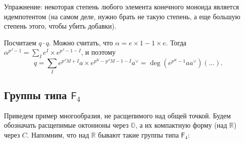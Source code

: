 \documentclass[a4paper]{article}
\theoremstyle{definition}
\begin{document}
\begin{enumerate}
Упражнение: некоторая степень любого элемента конечного моноида
является идемпотентом
(на самом деле, нужно брать не такую степень, а еще большую
степень этого, чтобы убить добавки).

Посчитаем $q\cdot q$.
Можно считать, что $\alpha = e\times 1 - 1\times e$.
Тогда
$\alpha^{p^J-1} = \sum_{I} e^I \times e^{p^J-1-I}$,
и поэтому
\[
q = \sum_I e^{p^J M + I} a
\times e^{p^K-p^J M - 1 - I}a^{\vee}
= \deg(e^{p^K-1} a a^{\vee})(\dots).
\]
\end{enumerate}

\subsection{Группы типа $\mathsf{F}_4$}

Приведем пример многообразия, не расщепимого над общей точкой.
Будем обозначать расщепимые октонионы через $\mathbb{O}$,
а их компактную форму (над $\mathbb{R}$) через $C$.
Напомним, что над $\mathbb{R}$
бывают такие группы типа $\mathsf{F}_4$:
\end{document}

